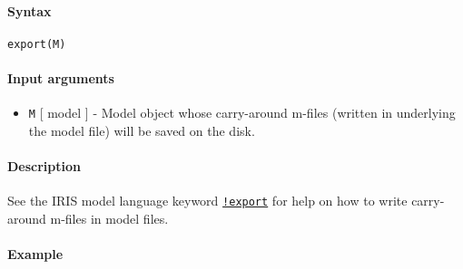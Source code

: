 


	\paragraph{Syntax}

\begin{verbatim}
export(M)
\end{verbatim}

\paragraph{Input arguments}

\begin{itemize}
\itemsep1pt\parskip0pt
\item
  \texttt{M} {[} model {]} - Model object whose carry-around m-files
  (written in underlying the model file) will be saved on the disk.
\end{itemize}

\paragraph{Description}

See the IRIS model language keyword
\href{modellang/export}{\texttt{!export}} for help on how to write
carry-around m-files in model files.

\paragraph{Example}


